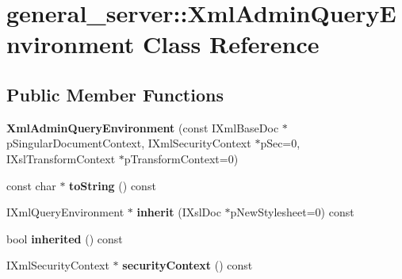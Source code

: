 \hypertarget{classgeneral__server_1_1XmlAdminQueryEnvironment}{\section{general\-\_\-server\-:\-:\-Xml\-Admin\-Query\-Environment \-Class \-Reference}
\label{classgeneral__server_1_1XmlAdminQueryEnvironment}
}
\subsection*{\-Public \-Member \-Functions}
\begin{DoxyCompactItemize}
\item 
\hypertarget{classgeneral__server_1_1XmlAdminQueryEnvironment_add805558973d8710ff345f4d2ada32c2}{{\bfseries \-Xml\-Admin\-Query\-Environment} (const \-I\-Xml\-Base\-Doc $\ast$p\-Singular\-Document\-Context, \-I\-Xml\-Security\-Context $\ast$p\-Sec=0, \-I\-Xsl\-Transform\-Context $\ast$p\-Transform\-Context=0)}\label{classgeneral__server_1_1XmlAdminQueryEnvironment_add805558973d8710ff345f4d2ada32c2}

\item 
\hypertarget{classgeneral__server_1_1XmlAdminQueryEnvironment_aa6c8af05aa8e7b51f66a3e5973b611fe}{const char $\ast$ {\bfseries to\-String} () const }\label{classgeneral__server_1_1XmlAdminQueryEnvironment_aa6c8af05aa8e7b51f66a3e5973b611fe}

\item 
\hypertarget{classgeneral__server_1_1XmlAdminQueryEnvironment_ae0948a652f11f999b9695afbc86240fe}{\-I\-Xml\-Query\-Environment $\ast$ {\bfseries inherit} (\-I\-Xsl\-Doc $\ast$p\-New\-Stylesheet=0) const }\label{classgeneral__server_1_1XmlAdminQueryEnvironment_ae0948a652f11f999b9695afbc86240fe}

\item 
\hypertarget{classgeneral__server_1_1XmlAdminQueryEnvironment_a5ab0a46af4235e6dadc735de1c428f31}{bool {\bfseries inherited} () const }\label{classgeneral__server_1_1XmlAdminQueryEnvironment_a5ab0a46af4235e6dadc735de1c428f31}

\item 
\hypertarget{classgeneral__server_1_1XmlAdminQueryEnvironment_ab8d5cea6eac5c74110d3ca22e16de879}{\-I\-Xml\-Security\-Context $\ast$ {\bfseries security\-Context} () const }\label{classgeneral__server_1_1XmlAdminQueryEnvironment_ab8d5cea6eac5c74110d3ca22e16de879}


\end{DoxyCompactItemize}
